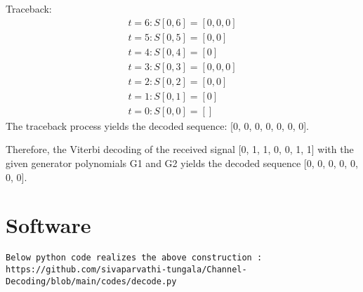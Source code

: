 \documentclass[10pt, onecolumn]{article}
\begin{document}
Traceback:
\begin{align}
t = 6: S[0, 6] = [0, 0, 0]\\
t = 5: S[0, 5] = [0, 0]\\
t = 4: S[0, 4] = [0]\\
t = 3: S[0, 3] = [0, 0, 0]\\
t = 2: S[0, 2] = [0, 0]\\
t = 1: S[0, 1] = [0]\\
t = 0: S[0, 0] = []
\end{align}
The traceback process yields the decoded sequence: [0, 0, 0, 0, 0, 0, 0].

Therefore, the Viterbi decoding of the received signal [0, 1, 1, 0, 0, 1, 1] with the given generator polynomials G1 and G2 yields the decoded sequence [0, 0, 0, 0, 0, 0, 0].
\section{Software}
\begin{center}
 \begin{lstlisting}
Below python code realizes the above construction :
https://github.com/sivaparvathi-tungala/Channel-Decoding/blob/main/codes/decode.py
 \end{lstlisting}
\end{center}
\end{document}
